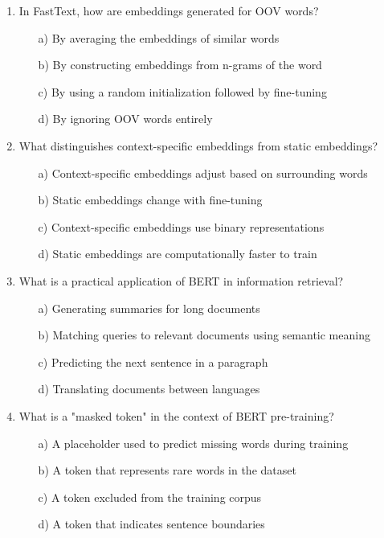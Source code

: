 \documentclass[8pt]{extarticle}
\begin{document}
\begin{multicols}{2}
\begin{enumerate}
\item In FastText, how are embeddings generated for OOV words?
\begin{itemize}
\item[a)] By averaging the embeddings of similar words
\item[b)] By constructing embeddings from n-grams of the word
\item[c)] By using a random initialization followed by fine-tuning
\item[d)] By ignoring OOV words entirely
\end{itemize}

\item What distinguishes context-specific embeddings from static embeddings?
\begin{itemize}
\item[a)] Context-specific embeddings adjust based on surrounding words
\item[b)] Static embeddings change with fine-tuning
\item[c)] Context-specific embeddings use binary representations
\item[d)] Static embeddings are computationally faster to train
\end{itemize}

\item What is a practical application of BERT in information retrieval?
\begin{itemize}
\item[a)] Generating summaries for long documents
\item[b)] Matching queries to relevant documents using semantic meaning
\item[c)] Predicting the next sentence in a paragraph
\item[d)] Translating documents between languages
\end{itemize}

\item What is a "masked token" in the context of BERT pre-training?
\begin{itemize}
\item[a)] A placeholder used to predict missing words during training
\item[b)] A token that represents rare words in the dataset
\item[c)] A token excluded from the training corpus
\item[d)] A token that indicates sentence boundaries
\end{itemize}


\end{enumerate}
\end{multicols}
\end{document}
